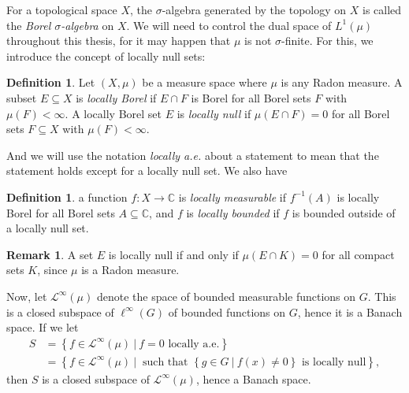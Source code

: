 \documentclass[10pt,twoside,openany,final]{memoir}
\theoremstyle{definition}
\newtheorem{definition}[theorem]{Definition}
\theoremstyle{Break}
\newtheorem*{remark}{Remark}
\newcommand{\C}{\mathbb{C}}
\begin{document}
For a topological space $X$, the $\sigma$-algebra generated by the topology on $X$ is called the \emph{Borel $\sigma$-algebra} on $X$. We will need to control the dual space of $L^1(\mu)$ throughout this thesis, for it may happen that $\mu$ is not $\sigma$-finite. For this, we introduce the concept of locally null sets:
\begin{definition}
	Let $(X,\mu)$ be a measure space where $\mu$ is any Radon measure. A subset $E \subseteq X$ is \emph{locally Borel} if $E \cap F$ is Borel for all Borel sets $F$ with $\mu(F) < \infty$. A locally Borel set $E$ is \emph{locally null} if $\mu(E\cap F) =0$ for all Borel sets $F \subseteq X$ with $\mu(F) < \infty$.
\end{definition}
And we will use the notation \textit{locally a.e.} about a statement to mean that the statement holds except for a locally null set. We also have
\begin{definition}
	a function $f \colon X \to \C$ is \emph{locally measurable} if $f^{-1}(A)$ is locally Borel for all Borel sets $A \subseteq \C$, and $f$ is \emph{locally bounded} if $f$ is bounded outside of a locally null set.
\end{definition}
\begin{remark}
	A set $E$ is locally null if and only if $\mu(E\cap K)=0$ for all compact sets $K$, since $\mu$ is a Radon measure.
\end{remark}

Now, let $\mathcal{L}^{\infty}(\mu)$ denote the space of bounded measurable functions on $G$.
This is a closed subspace of $\ell^\infty(G)$ of bounded functions on $G$, hence it is a Banach space. If we let 
\begin{align*}
	S&=\left\{ f \in \mathcal{L}^{\infty}(\mu) \ | \ f=0 \text{ locally a.e.} \right\}\\
	&=\left\{ f \in \mathcal{L}^{\infty}(\mu) \ | \ \text{ such that } \left\{ g \in G \ |  \ f(x) \neq 0 \right\} \text{ is locally null} \right\},
\end{align*}
then $S$ is a closed subspace of $\mathcal{L}^{\infty}(\mu)$, hence a Banach space. 
\end{document}
